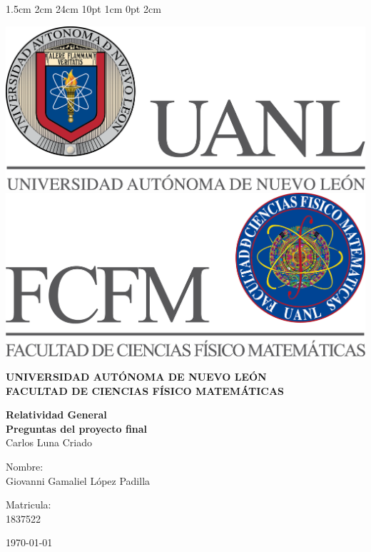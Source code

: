 \documentclass[12pt,letterpaper]{report}
\begin{document}
\setmargins{2.5cm}      
{1.5cm}                     
{2cm}  
{24cm}                    
{10pt}                          
{1cm}                          
{0pt}                             
{2cm}
\begin{titlepage}
\begin{center}
\includegraphics[scale=0.40]{../../Logos/uanl.png} 
\hspace{2.5cm}
\includegraphics[scale=0.40]{../../Logos/fcfm.png}
\end{center}
\vspace{2cm}
\begin{center}
\textbf{
UNIVERSIDAD AUTÓNOMA DE NUEVO LEÓN\\
FACULTAD DE CIENCIAS
    FÍSICO MATEMÁTICAS}\\
\vspace*{2cm}
\begin{large}
\vspace{1cm}
\large{\textbf{Relatividad General}}\\
\textbf{Preguntas del proyecto final}\\
Carlos Luna Criado\\
\end{large}
\vspace{3.5cm}
\begin{minipage}{0.6\linewidth}
\vspace{0.5cm}
\changefontsizes{14pt}
Nombre:\\
Giovanni Gamaliel López Padilla\\
\end{minipage}
\begin{minipage}{0.2\linewidth}
\changefontsizes{14pt}
Matricula:\\
1837522
\end{minipage}
\end{center}
\vspace{4cm}
\begin{flushright}
\today
\end{flushright}
\end{titlepage}
\end{document}

